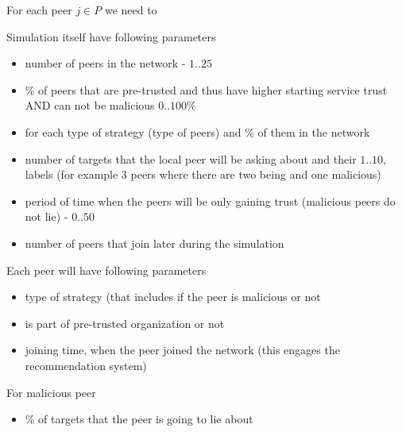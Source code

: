 For each peer $j \in P$ we need to 

Simulation itself have following parameters
\begin{itemize}
    \item number of peers in the network - $1..25$
    \item \% of peers that are pre-trusted and thus have higher starting service trust AND can not be malicious $0..100\%$
    \item for each type of strategy (type of peers) and \% of them in the network
    \item number of targets that the local peer will be asking about and their $1..10$, labels (for example 3 peers where there are two being and one malicious)
    \item period of time when the peers will be only gaining trust (malicious peers do not lie) - $0..50$
    \item number of peers that join later during the simulation
\end{itemize}

Each peer will have following parameters
\begin{itemize}
    \item type of strategy (that includes if the peer is malicious or not
    \item is part of pre-trusted organization or not
    \item joining time, when the peer joined the network (this engages the recommendation system)
\end{itemize}

For malicious peer 
\begin{itemize}
    \item \% of targets that the peer is going to lie about
\end{itemize}